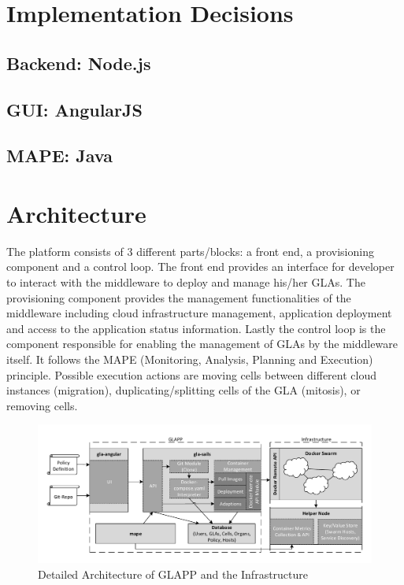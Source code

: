 \documentclass{seal_thesis}
\begin{document}
\section{Implementation Decisions}
\subsection{Backend: Node.js}

\subsection{GUI: AngularJS}

\subsection{MAPE: Java}

\section{Architecture}
The platform consists of 3 different parts/blocks: a front end, a provisioning component and a control loop.
The front end provides an interface for developer to interact with the middleware to deploy and manage his/her GLAs.
The provisioning component provides the management functionalities of the middleware including cloud infrastructure management, application deployment and access to the application status information.
Lastly the control loop is the component responsible for enabling the management of GLAs by the middleware itself.
It follows the MAPE (Monitoring, Analysis, Planning and Execution) principle.
Possible execution actions are moving cells between different cloud instances (migration), duplicating/splitting cells of the GLA (mitosis), or removing cells.

\begin{figure}[!ht]
\centering
	\includegraphics[width=\textwidth]{detailed_architecture.pdf}
	\caption{Detailed Architecture of GLAPP and the Infrastructure}
	\label{fig:detailed}
\end{figure}
\end{document}
